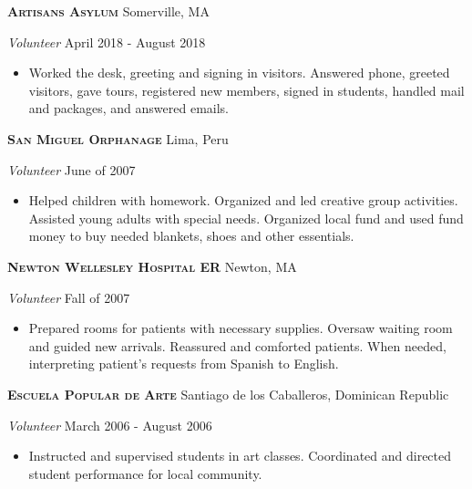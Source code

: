 \documentclass[a4paper]{article}
\begin{document}
\textbf{\textsc{Artisans Asylum}} \hfill Somerville, MA\\
\begin{addmargin}[1em]{0em}
\vspace{2mm}
\textit{Volunteer} \hfill April 2018 - August 2018\\
\vspace{-1mm}
\begin{itemize} \itemsep 1pt
    \item Worked the desk, greeting and signing in visitors. Answered phone,
    greeted visitors, gave tours, registered new members, signed in students, 
    handled mail and packages, and answered emails.
\end{itemize}
\end{addmargin}

\textbf{\textsc{San Miguel Orphanage}} \hfill Lima, Peru\\
\begin{addmargin}[1em]{0em}
\vspace{2mm}
\textit{Volunteer} \hfill June of 2007\\
\vspace{-1mm}
\begin{itemize} \itemsep 1pt
    \item Helped children with homework.  Organized and led creative group activities.
        Assisted young adults with special needs. Organized local fund and used fund money
        to buy needed blankets, shoes and other essentials.
\end{itemize}
\end{addmargin}

\textbf{\textsc{Newton Wellesley Hospital ER}} \hfill Newton, MA\\
\begin{addmargin}[1em]{0em}
\vspace{2mm}
\textit{Volunteer} \hfill Fall of 2007\\
\vspace{-1mm}
\begin{itemize} \itemsep 1pt
    \item Prepared rooms for patients with necessary supplies. Oversaw waiting room and
        guided new arrivals. Reassured and comforted patients. When needed, interpreting 
        patient’s requests from Spanish to English.
\end{itemize}
\end{addmargin}

\textbf{\textsc{Escuela Popular de Arte}} \hfill Santiago de los Caballeros, Dominican Republic\\
\begin{addmargin}[1em]{0em}
\vspace{2mm}
\textit{Volunteer} \hfill March 2006 - August 2006\\
\vspace{-1mm}
\begin{itemize} \itemsep 1pt
    \item Instructed and supervised students in art classes. Coordinated and directed student 
        performance for local community. 
\end{itemize}
\end{addmargin}
\end{document}
